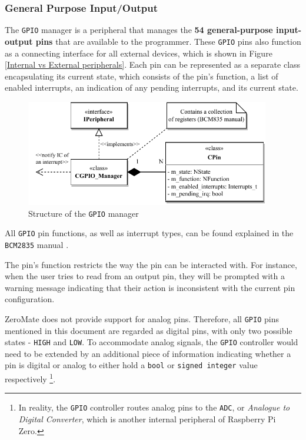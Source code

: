 \documentclass[english, ing, kiv, he, iso690numb, pdf]{fasthesis}
\begin{document}
	\newpage
	
	\subsubsection{General Purpose Input/Output}
	
	The \texttt{GPIO} manager is a peripheral that manages the \textbf{54 general-purpose input-output pins} that are available to the programmer. These \texttt{GPIO} pins also function as a connecting interface for all external devices, which is shown in Figure \ref{Internal vs External peripherals}. Each pin can be represented as a separate class encapsulating its current state, which consists of the pin's function, a list of enabled interrupts, an indication of any pending interrupts, and its current state.
	
	\begin{figure}[ht]
		\centering
		\includegraphics[width=0.95\textwidth]{img/diagrams/gpio_manager.pdf}
		\caption{Structure of the \texttt{GPIO} manager\protect\footnotemark}
		\label{Structure of the GPIO manager}
	\end{figure}
	
	
	All \texttt{GPIO} pin functions, as well as interrupt types, can be found explained in the \texttt{BCM2835} manual \cite{BCM2835}.
	
	The pin's function restricts the way the pin can be interacted with. For instance, when the user tries to read from an output pin, they will be prompted with a warning message indicating that their action is inconsistent with the current pin configuration.
	
	\begin{important}
		ZeroMate does not provide support for analog pins. Therefore, all \texttt{GPIO} pins mentioned in this document are regarded as digital pins, with only two possible states - \texttt{HIGH} and \texttt{LOW}. To accommodate analog signals, the \texttt{GPIO} controller would need to be extended by an additional piece of information indicating whether a pin is digital or analog to  either hold a \texttt{bool} or \texttt{signed integer} value respectively \footnote{In reality, the \texttt{GPIO} controller routes analog pins to the \texttt{ADC}, or \textit{Analogue to Digital Converter}, which is another internal peripheral of Raspberry Pi Zero.}.
	\end{important}
	
\end{document}
